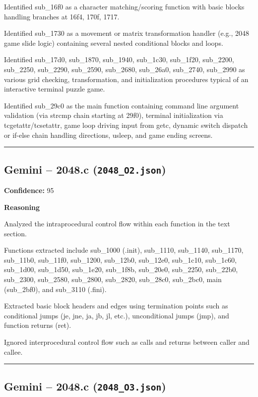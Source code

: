 Identified sub\_16f0 as a character matching/scoring function with basic blocks handling branches at 16f4, 170f, 1717.

Identified sub\_1730 as a movement or matrix transformation handler (e.g., 2048 game slide logic) containing several nested conditional blocks and loops.

Identified sub\_17d0, sub\_1870, sub\_1940, sub\_1c30, sub\_1f20, sub\_2200, sub\_2250, sub\_2290, sub\_2590, sub\_2680, sub\_26a0, sub\_2740, sub\_2990 as various grid checking, transformation, and initialization procedures typical of an interactive terminal puzzle game.

Identified sub\_29c0 as the main function containing command line argument validation (via strcmp chain starting at 29f0), terminal initialization via tcgetattr/tcsetattr, game loop driving input from getc, dynamic switch dispatch or if-else chain handling directions, usleep, and game ending screens.

\bigskip
\hrule
\bigskip

\subsection{Gemini -- 2048.c (\texttt{2048\_O2.json})}

\textbf{Confidence:} 95

\textbf{Reasoning}

Analyzed the intraprocedural control flow within each function in the text section.

Functions extracted include sub\_1000 (.init), sub\_1110, sub\_1140, sub\_1170, sub\_11b0, sub\_11f0, sub\_1200, sub\_12b0, sub\_12e0, sub\_1c10, sub\_1c60, sub\_1d00, sub\_1d50, sub\_1e20, sub\_1f8b, sub\_20e0, sub\_2250, sub\_22b0, sub\_2300, sub\_2580, sub\_2800, sub\_2820, sub\_28c0, sub\_2bc0, main (sub\_2bf0), and sub\_3110 (.fini).

Extracted basic block headers and edges using termination points such as conditional jumps (je, jne, ja, jb, jl, etc.), unconditional jumps (jmp), and function returns (ret).

Ignored interprocedural control flow such as calls and returns between caller and callee.

\bigskip
\hrule
\bigskip

\subsection{Gemini -- 2048.c (\texttt{2048\_O3.json})}

